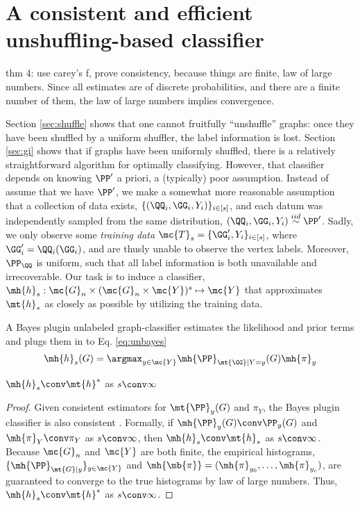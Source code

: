 \documentclass[10pt,journal,cspaper,compsoc]{IEEEtran}
\begin{document}
\section{A consistent and efficient unshuffling-based classifier} %
\label{sec:bayes_optimal_graph_invariant_based_classifier}


thm 4: use carey's f, prove consistency, because things are finite, law of large numbers.  Since all estimates are of discrete probabilities, and there are a finite number of them, the law of large numbers implies convergence.


Section \ref{sec:shuffle} shows that one cannot fruitfully ``unshuffle'' graphs: once they have been shuffled by a uniform shuffler, the label information is lost.  Section \ref{sec:gi} shows that if graphs have been uniformly shuffled, there is a relatively straightforward algorithm for optimally classifying. However, that classifier depends on knowing $\PP'$ a priori, a (typically) poor assumption. Instead of assume that we have $\PP'$, we make a somewhat more reasonable assumption that a collection of data exists, $\{(\QQ_i,\GG_i,Y_i)\}_{i \in [s]}$, and each datum was independently sampled from the same distribution, $(\QQ_i,\GG_i,Y_i)\overset{iid}{\sim}\PP'$.  Sadly, we only observe some \emph{training data} $\mc{T}_s=\{\GG_i',Y_i\}_{i \in [s]}$, where $\GG_i'=\QQ_i(\GG_i)$, and are thusly unable to observe the vertex labels.  Moreover, $\PP_{\QQ}$ is uniform, such that all label information is both unavailable and irrecoverable.  Our task is to induce a classifier, $\mh{h}_s: \mc{G}_n \times (\mc{G}_n \times \mc{Y})^s \mapsto \mc{Y}$ that approximates $\mt{h}_*$ as closely as possible by utilizing the training data.  

A Bayes plugin unlabeled graph-classifier estimates the likelihood and prior terms and plugs them in to Eq. \eqref{eq:unbayes}
\begin{align} \label{eq:class}
	\mh{h}_s(G)=\argmax_{y\in\mc{Y}} \mh{\PP}_{\mt{\GG}|Y=y}(G)\mh{\pi}_y
\end{align}

\begin{thm} \label{thm:conv}
	$\mh{h}_s \conv \mt{h}^*$ as $s \conv \infty$
\end{thm}

\begin{proof}
Given consistent estimators for $\mt{\PP}_y(G)$ and $\pi_Y$, the Bayes plugin classifier is also consistent \cite{DEV96}.  Formally, if $\mh{\PP}_y(G) \conv \PP_y(G)$ and $\mh{\pi}_Y\conv \pi_Y$ as $s \conv \infty$, then $\mh{h}_s \conv \mt{h}_*$ as $s\conv \infty$.  Because $\mc{G}_n$ and $\mc{Y}$ are both finite, the empirical histograms, $\{\mh{\PP}_{\mt{G}|y}\}_{y\in \mc{Y}}$ and $\mh{\mb{\pi}}=(\mh{\pi}_{y_0},\ldots, \mh{\pi}_{y_{c}})$, are guaranteed to converge to the true histograms by law of large numbers.  Thus, $\mh{h}_s \conv \mt{h}^*$ as $s \conv \infty$.
\end{proof}
\end{document}
